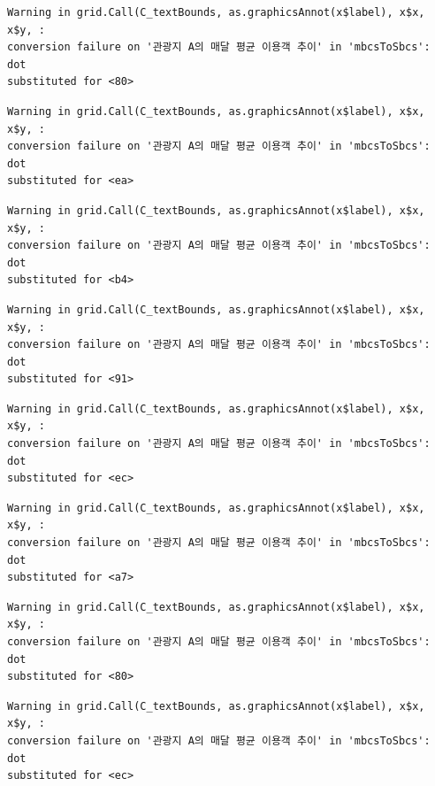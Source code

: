 \documentclass[
  letterpaper,
  DIV=11,
  numbers=noendperiod]{scrreprt}
\begin{document}
\begin{verbatim}
Warning in grid.Call(C_textBounds, as.graphicsAnnot(x$label), x$x, x$y, :
conversion failure on '관광지 A의 매달 평균 이용객 추이' in 'mbcsToSbcs': dot
substituted for <80>
\end{verbatim}

\begin{verbatim}
Warning in grid.Call(C_textBounds, as.graphicsAnnot(x$label), x$x, x$y, :
conversion failure on '관광지 A의 매달 평균 이용객 추이' in 'mbcsToSbcs': dot
substituted for <ea>
\end{verbatim}

\begin{verbatim}
Warning in grid.Call(C_textBounds, as.graphicsAnnot(x$label), x$x, x$y, :
conversion failure on '관광지 A의 매달 평균 이용객 추이' in 'mbcsToSbcs': dot
substituted for <b4>
\end{verbatim}

\begin{verbatim}
Warning in grid.Call(C_textBounds, as.graphicsAnnot(x$label), x$x, x$y, :
conversion failure on '관광지 A의 매달 평균 이용객 추이' in 'mbcsToSbcs': dot
substituted for <91>
\end{verbatim}

\begin{verbatim}
Warning in grid.Call(C_textBounds, as.graphicsAnnot(x$label), x$x, x$y, :
conversion failure on '관광지 A의 매달 평균 이용객 추이' in 'mbcsToSbcs': dot
substituted for <ec>
\end{verbatim}

\begin{verbatim}
Warning in grid.Call(C_textBounds, as.graphicsAnnot(x$label), x$x, x$y, :
conversion failure on '관광지 A의 매달 평균 이용객 추이' in 'mbcsToSbcs': dot
substituted for <a7>
\end{verbatim}

\begin{verbatim}
Warning in grid.Call(C_textBounds, as.graphicsAnnot(x$label), x$x, x$y, :
conversion failure on '관광지 A의 매달 평균 이용객 추이' in 'mbcsToSbcs': dot
substituted for <80>
\end{verbatim}

\begin{verbatim}
Warning in grid.Call(C_textBounds, as.graphicsAnnot(x$label), x$x, x$y, :
conversion failure on '관광지 A의 매달 평균 이용객 추이' in 'mbcsToSbcs': dot
substituted for <ec>
\end{verbatim}
\end{document}
